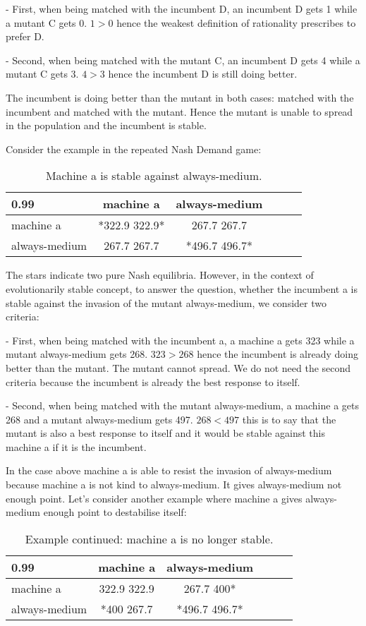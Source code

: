 \documentclass[12.5pt]{report}
\begin{document}
- First, when being matched with the incumbent D, an incumbent D gets 1 while a mutant C gets 0. $1 > 0$ hence the weakest definition of rationality prescribes to prefer D.

- Second, when being matched with the mutant C, an incumbent D gets 4 while a mutant C gets 3. $4 > 3$ hence the incumbent D is still doing better.

The incumbent is doing better than the mutant in both cases: matched with the incumbent and matched with the mutant. Hence the mutant is unable to spread in the population and the incumbent is stable.


Consider the example in the repeated Nash Demand game:

\begin{table}[h!]
\center
\begin{tabular}{l|ccccc}
\textbf{0.99}& machine a & always-medium \\
\hline
machine a & *322.9 322.9* &   267.7 267.7   \\
always-medium  &  267.7 267.7  &    *496.7 496.7*  \\
\end{tabular}
\caption{Machine a is stable against always-medium.}
\end{table}

The stars indicate two pure Nash equilibria. However, in the context of evolutionarily stable concept, to answer the question, whether the incumbent a is stable against the invasion of the mutant always-medium, we consider two criteria:

- First, when being matched with the incumbent a, a machine a gets 323 while a mutant always-medium gets 268. $323 > 268$ hence the incumbent is already doing better than the mutant. The mutant cannot spread. We do not need the second criteria because the incumbent is already the best response to itself.

- Second, when being matched with the mutant always-medium, a machine a gets 268 and a mutant always-medium gets 497. $268 < 497$ this is to say that the mutant is also a best response to itself and it would be stable against this machine a if it is the incumbent.

In the case above machine a is able to resist the invasion of always-medium because machine a is not kind to always-medium. It gives always-medium not enough point. Let's consider another example where machine a gives always-medium enough point to destabilise itself:

\begin{table}[h!]
\center
\begin{tabular}{l|ccccc}
\textbf{0.99}& machine a & always-medium \\
\hline
machine a & 322.9 322.9 &   267.7 400*   \\
always-medium  &  *400 267.7  &    *496.7 496.7*  \\
\end{tabular}
\caption{Example continued: machine a is no longer stable.}
\end{table}
\end{document}
